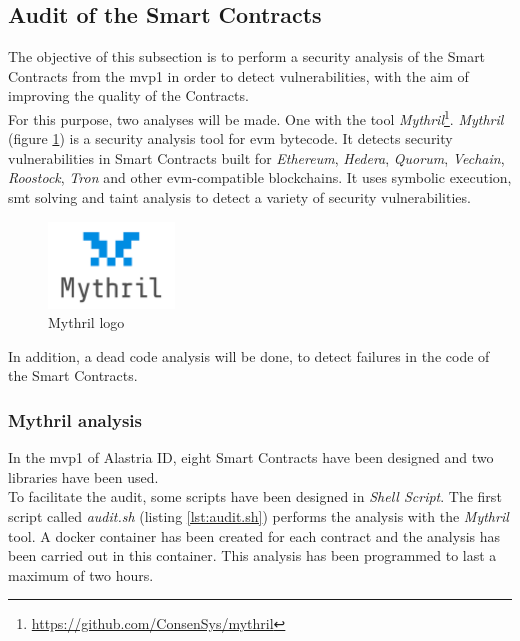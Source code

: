 \subsection{Audit of the Smart Contracts}
The objective of this subsection is to perform a security analysis of the Smart Contracts from the  \acrshort{mvp}1 in order to detect vulnerabilities, with the aim of improving the quality of the Contracts.\\

For this purpose, two analyses will be made. One with the tool \textit{Mythril}\footnote{\url{https://github.com/ConsenSys/mythril}}. \textit{Mythril} (figure \ref{fig:myth}) is a security analysis tool for \acrshort{evm} bytecode. It detects security vulnerabilities in Smart Contracts built for \textit{Ethereum}, \textit{Hedera}, \textit{Quorum}, \textit{Vechain}, \textit{Roostock}, \textit{Tron} and other \acrshort{evm}-compatible blockchains. It uses symbolic execution, \acrshort{smt} solving and taint analysis to detect a variety of security vulnerabilities.
\begin{figure}[h]
    \centering
    \includegraphics[width=0.3\textwidth]{images/Security Audit/mythril_logo.png}
    \caption{Mythril logo}
    \label{fig:myth}
\end{figure}

In addition, a dead code analysis will be done, to detect failures in the code of the Smart Contracts.

\subsubsection{Mythril analysis}
In the \acrshort{mvp}1 of Alastria ID, eight Smart Contracts have been designed and two libraries have been used.\\

To facilitate the audit, some scripts have been designed in \textit{Shell Script}. The first script called \textit{audit.sh} (listing \ref{lst:audit.sh}) performs the analysis with the \textit{Mythril} tool. A docker container has been created for each contract and the analysis has been carried out in this container. This analysis has been programmed to last a maximum of two hours.

